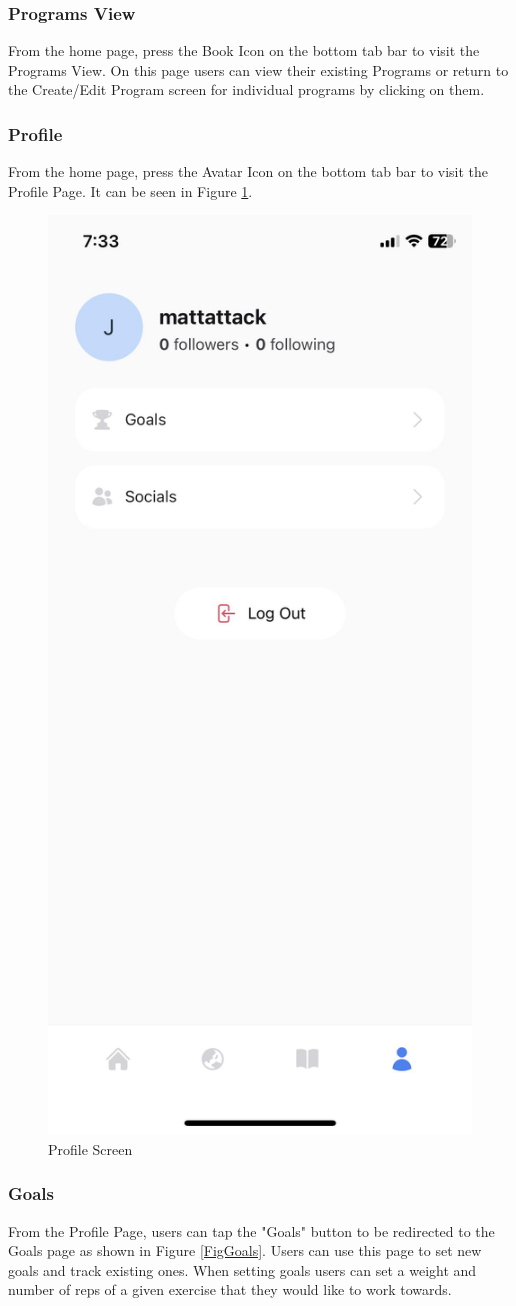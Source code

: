 \documentclass{article}
\begin{document}
\subsubsection{Programs View}

From the home page, press the Book Icon on the bottom tab bar to visit the Programs View. On this page users can view their existing Programs or return to the Create/Edit Program screen for individual programs by clicking on them.

\subsubsection{Profile}

From the home page, press the Avatar Icon on the bottom tab bar to visit the Profile Page. It can be seen in Figure \ref{FigProfile}.

\begin{figure}[H]
    \centering
    \includegraphics[height=0.6\textwidth]{imgs/Profile.jpg}
    \caption{Profile Screen}
    \label{FigProfile}
    \end{figure}

\subsubsection{Goals}

From the Profile Page, users can tap the "Goals" button to be redirected to the Goals page as shown in Figure \ref{FigGoals}. Users can use this page to set new goals and track existing ones. When setting goals users can set a weight and number of reps of a given exercise that they would like to work towards.
\end{document}
